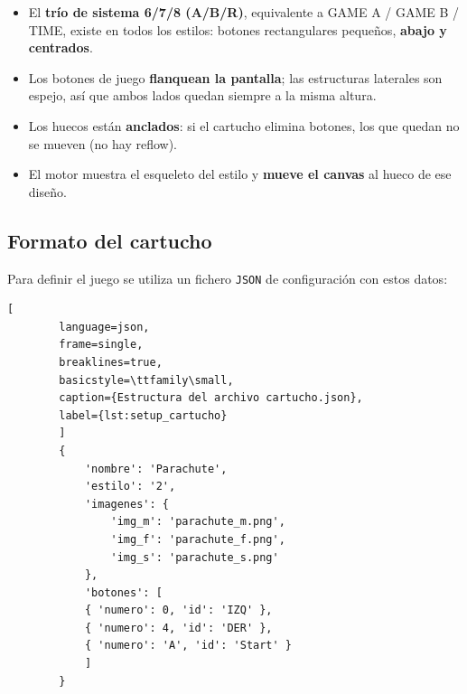 	\begin{itemize}
		\item El \textbf{trío de sistema 6/7/8 (A/B/R)}, equivalente a GAME A / GAME B / TIME, existe en todos los estilos: botones rectangulares pequeños, \textbf{abajo y centrados}.
		\item Los botones de juego \textbf{flanquean la pantalla}; las estructuras laterales son espejo, así que ambos lados quedan siempre a la misma altura.
		\item Los huecos están \textbf{anclados}: si el cartucho elimina botones, los que quedan no se mueven (no hay reflow).
		\item El motor muestra el esqueleto del estilo y \textbf{mueve el canvas} al hueco de ese diseño.
	\end{itemize}
	
	\subsection{Formato del cartucho}
	
	Para definir el juego se utiliza un fichero \texttt{JSON} de configuración con estos datos:
	
	\begin{lstlisting}[
		language=json, 
		frame=single, 
		breaklines=true, 
		basicstyle=\ttfamily\small,
		caption={Estructura del archivo cartucho.json},
		label={lst:setup_cartucho}
		]
		{
			'nombre': 'Parachute',
			'estilo': '2',
			'imagenes': {								 
				'img_m': 'parachute_m.png',	
				'img_f': 'parachute_f.png',
				'img_s': 'parachute_s.png'
			},
			'botones': [
			{ 'numero': 0, 'id': 'IZQ' },
			{ 'numero': 4, 'id': 'DER' },
			{ 'numero': 'A', 'id': 'Start' }		
			]
		}
	\end{lstlisting}
	
